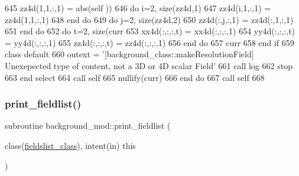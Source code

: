 \begin{DoxyCode}
645                 zz4d(1,1,:,1) = abs(self%
      ))
646                 \textcolor{keywordflow}{do} i=2, \textcolor{keyword}{size}(zz4d,1)
647                     zz4d(i,1,:,1) = zz4d(1,1,:,1)
648 \textcolor{keywordflow}{                end do}
649                 \textcolor{keywordflow}{do} j=2, \textcolor{keyword}{size}(zz4d,2)
650                     zz4d(:,j,:,1) = zz4d(:,1,:,1)
651 \textcolor{keywordflow}{                end do}
652                 \textcolor{keywordflow}{do} t=2, \textcolor{keyword}{size}(curr%
653                     xx4d(:,:,:,t) = xx4d(:,:,:,1)
654                     yy4d(:,:,:,t) = yy4d(:,:,:,1)
655                     zz4d(:,:,:,t) = zz4d(:,:,:,1)
656 \textcolor{keywordflow}{                end do}
657                 curr%
658 \textcolor{keywordflow}{            end if}
659 \textcolor{keywordflow}{            class default}
660             outext = \textcolor{stringliteral}{'[background\_class::makeResolutionField] Unexepected type of content, not a 3D or 4D
       scalar Field'}
661             \textcolor{keyword}{call }log%
662             stop
663 \textcolor{keywordflow}{        end select}
664         \textcolor{keyword}{call }self%
665         \textcolor{keyword}{nullify}(curr)
666 \textcolor{keywordflow}{    end do}
667     \textcolor{keyword}{call }self%
668 
\end{DoxyCode}
\mbox{\label{namespacebackground__mod_acdcc52b4fb298bc145a121f9e8a4b929}} 
\subsubsection{\texorpdfstring{print\+\_\+fieldlist()}{print\_fieldlist()}}
{\footnotesize\ttfamily subroutine background\+\_\+mod\+::print\+\_\+fieldlist (\begin{DoxyParamCaption}\item[{class(\mbox{\hyperlink{structbackground__mod_1_1fieldslist__class}{fieldslist\+\_\+class}}), intent(in)}]{this }\end{DoxyParamCaption})\hspace{0.3cm}{\ttfamily [private]}}



